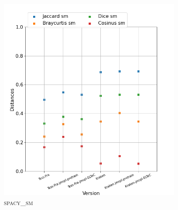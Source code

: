 \begin{figure}[H]
\begin{minipage}{6cm}
\begin{subfigure}{0.89\textwidth}
  \label{fig: }
  \end{subfigure}
  \end{minipage}
  \begin{minipage}{6cm}
  \begin{subfigure}{0.89\textwidth}
  \includegraphics[width=.89\textwidth]{IMAGES/ELTeC_DISTANCES_spaCy3.5.1/DAUDET-graph-dist-spaCy3.5.1-sm.png} 
  \caption{\textsc{spacy\_sm}}
  \label{fig:}
  \end{subfigure}
    \end{minipage}
  \begin{minipage}{6cm}
  \begin{subfigure}{0.89\textwidth}

\end{subfigure}
\end{minipage}
\end{figure}
